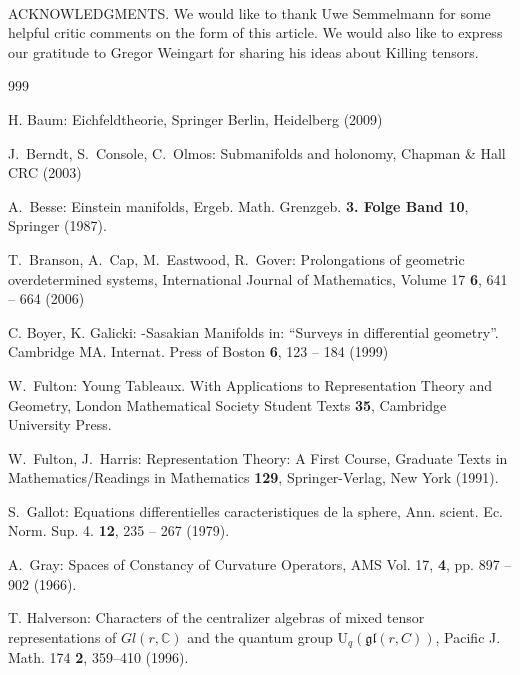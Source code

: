 \documentclass[11pt,a4paper]{article}
\theoremstyle{plain}
\theoremstyle{remark}
\newcommand{\gl}{\mathfrak{gl}}
\newcommand{\C}{\mathbb{C}}
\newcommand{\rmU}{\mathrm{U}}
\begin{document}
\paragraph{}ACKNOWLEDGMENTS. We would like to thank Uwe Semmelmann for some helpful critic comments on the form of this article. We would also like to express our gratitude 
to Gregor Weingart for sharing his ideas about Killing tensors.
\ \ \





\begin{thebibliography}{999}


 H. Baum:
\newblock Eichfeldtheorie, 
\newblock Springer Berlin, Heidelberg (2009)

 J.~Berndt, S.~Console, C.~Olmos:
\newblock Submanifolds and holonomy,
\newblock Chapman \& Hall CRC (2003)


 A.~Besse:
\newblock Einstein manifolds,
\newblock Ergeb. Math. Grenzgeb. {\bf 3. Folge Band 10}, Springer (1987).

 T.~Branson, A.~Cap, M.~Eastwood, R.~Gover:
\newblock Prolongations of geometric overdetermined systems,
\newblock International Journal of Mathematics, Volume 17 {\bf 6}, 641 -- 664 (2006)


 C. Boyer, K. Galicki:
-Sasakian Manifolds in: ``Surveys in differential geometry''. 
\newblock Cambridge MA. Internat. Press of Boston {\bf 6}, 123 -- 184 (1999)

 W.~Fulton:
\newblock Young Tableaux. With Applications to Representation Theory and Geometry,
\newblock London Mathematical Society Student Texts  {\bf 35}, Cambridge University Press.

 W.~Fulton,  J.~Harris:
\newblock Representation Theory: A First Course,
\newblock Graduate Texts in Mathematics/Readings in Mathematics {\bf 129}, Springer-Verlag, New York (1991).


 S.~Gallot:
\newblock Equations differentielles caracteristiques de la sphere,
\newblock Ann. scient. Ec. Norm. Sup. 4. {\bf 12},  235 -- 267 (1979).

 A.~Gray:
\newblock Spaces of Constancy of Curvature Operators,
\newblock  AMS Vol. 17, {\bf 4}, pp. 897 -- 902 (1966).

 T. Halverson:
\newblock Characters of the centralizer algebras of mixed tensor representations of $Gl(r,\C)$ and the quantum group $\rmU_q(\gl(r, C))$, 
\newblock Pacific J. Math. 174 {\bf 2}, 359–410  (1996).



\end{thebibliography}
\end{document}
